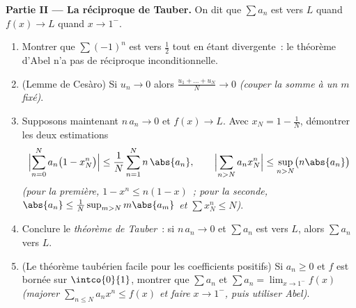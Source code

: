 \begin{problem}
\medskip
\noindent\textbf{Partie II --- La réciproque de Tauber.} On dit que $\sum
a_n$ est \emph{} vers $L$ quand $f(x) \to L$ quand $x \to
1^-$.
\begin{enumerate}[resume]
  \item Montrer que $\sum (-1)^n$ est  vers $\frac12$
        tout en étant divergente~: le théorème d'Abel n'a pas de
        réciproque inconditionnelle.
  \item (Lemme de Cesàro) Si $u_n \to 0$ alors $\frac{u_1 + \dots
        + u_N}{N} \to 0$ \emph{(couper la somme à un $m$ fixé)}.
  \item Supposons maintenant $n\,a_n \to 0$ et $f(x) \to L$. Avec $x_N =
        1 - \frac1N$, démontrer les deux estimations
        \[
        \Bigl|\sum_{n=0}^{N} a_n\bigl(1 - x_N^n\bigr)\Bigr|
        \leq \frac{1}{N}\sum_{n=1}^{N} n\,\abs{a_n},
        \qquad
        \Bigl|\sum_{n>N} a_n x_N^n\Bigr|
        \leq \sup_{n>N}\bigl(n\abs{a_n}\bigr)
        \]
        \emph{(pour la première, $1 - x^n \leq n(1-x)$~; pour la
        seconde, $\abs{a_n} \leq \frac{1}{N}\sup_{m>N}
        m\abs{a_m}$ et $\sum x_N^n \leq N$)}.
  \item Conclure le \emph{théorème de Tauber}~: si $n\,a_n \to 0$ et
        $\sum a_n$ est  vers $L$, alors $\sum a_n$
         vers $L$.
  \item (Le théorème taubérien facile pour les coefficients positifs) Si $a_n
        \geq 0$ et $f$ est bornée sur $\intco{0}{1}$, montrer que
        $\sum a_n$  et $\sum a_n = \lim_{x\to1^-}
        f(x)$ \emph{(majorer $\sum_{n\leq N}a_nx^n \leq f(x)$ et
        faire $x \to 1^-$, puis utiliser Abel)}.
\end{enumerate}


\end{problem}
